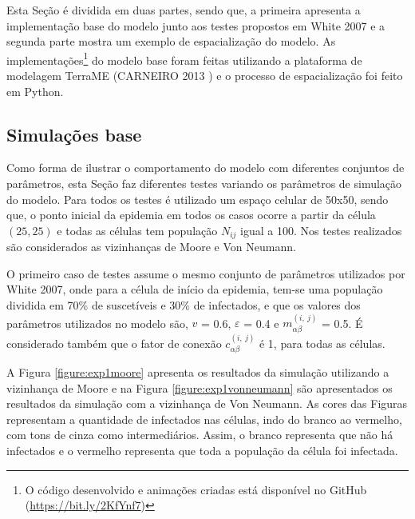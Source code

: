 \documentclass[a4paper,12pt]{article}
\begin{document}
Esta Seção é dividida em duas partes, sendo que, a primeira apresenta a implementação base do modelo junto aos testes propostos em White 2007\cite{White2007} e a segunda parte mostra um exemplo de espacialização do modelo. As implementações\footnote{O código desenvolvido e animações criadas está disponível no GitHub (\href{https://github.com/M3nin0/epidemic-model}{https://bit.ly/2KfYnf7})} do modelo base foram feitas utilizando a plataforma de modelagem TerraME (CARNEIRO 2013 \cite{CARNEIRO2013104}) e o processo de espacialização foi feito em Python.

\subsection{Simulações base}

Como forma de ilustrar o comportamento do modelo com diferentes conjuntos de parâmetros, esta Seção faz diferentes testes variando os parâmetros de simulação do modelo. Para todos os testes é utilizado um espaço celular de 50x50, sendo que, o ponto inicial da epidemia em todos os casos ocorre a partir da célula $(25,25)$ e todas as células tem população $N_{ij}$ igual a 100. Nos testes realizados são considerados as vizinhanças de Moore e Von Neumann. %

O primeiro caso de testes assume o mesmo conjunto de parâmetros utilizados por White 2007\cite{White2007}, onde para a célula de início da epidemia, tem-se uma população dividida em 70\% de suscetíveis e 30\% de infectados, e que os valores dos parâmetros utilizados no modelo são, $v$ = 0.6, $\varepsilon$ = 0.4 e  $ m_{\alpha \beta}^{\left(i,\:j\right)}$ = 0.5. É considerado também que o fator de conexão $c_{\alpha \beta}^{\left(i,\:j\right)}$ é 1, para todas as células. 

A Figura \ref{figure:exp1moore} apresenta os resultados da simulação utilizando a vizinhança de Moore e na Figura \ref{figure:exp1vonneumann} são apresentados os resultados da simulação com a vizinhança de Von Neumann. As cores das Figuras representam a quantidade de infectados nas células, indo do branco ao vermelho, com tons de cinza como intermediários. Assim, o branco representa que não há infectados e o vermelho representa que toda a população da célula foi infectada. 

\newpage 
\end{document}

